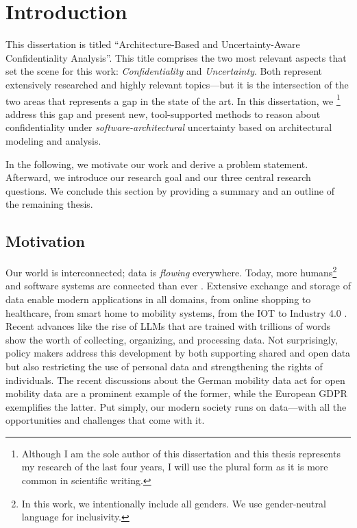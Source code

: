 \chapter{Introduction}%
\label{ch:introduction}%
 

This dissertation is titled \enquote{Architecture-Based and Uncertainty-Aware Confidentiality Analysis}.
This title comprises the two most relevant aspects that set the scene for this work: \emph{Confidentiality} and \emph{Uncertainty}.
Both represent extensively researched and highly relevant topics---but it is the intersection of the two areas that represents a gap in the state of the art.
In this dissertation, we%
\footnote{Although I am the sole author of this dissertation and this thesis represents my research of the last four years, I will use the plural form as it is more common in scientific writing.} address this gap and present new, tool-supported methods to reason about confidentiality under \emph{software-architectural} uncertainty based on architectural modeling and analysis.

In the following, we motivate our work and derive a problem statement.
Afterward, we introduce our research goal and our three central research questions.
We conclude this section by providing a summary and an outline of the remaining thesis.





\section{Motivation}%
\label{sec:introduction:motivation}

Our world is interconnected; data is \emph{flowing} everywhere.
Today, more humans\footnote{In this work, we intentionally include all genders. We use gender-neutral language for inclusivity.} and software systems are connected than ever \cite{statista_number_2004}.
Extensive exchange and storage of data enable modern applications in all domains, from online shopping to healthcare, from smart home to mobility systems, from the \ac{IOT} to Industry 4.0 \cite{heinrich_dynamic_2023}.
Recent advances like the rise of \acp{LLM} that are trained with trillions of words \cite{villalobos_will_2024,meta_introducing_2024} show the worth of collecting, organizing, and processing data.
Not surprisingly, policy makers address this development by both supporting shared and open data but also restricting the use of personal data and strengthening the rights of individuals.
The recent discussions about the German mobility data act for open mobility data \cite{bmdv_bmdv_2022} are a prominent example of the former, while the European \ac{GDPR} \cite{council_of_european_union_regulation_2016} exemplifies the latter.
Put simply, our modern society runs on data---with all the opportunities and challenges that come with it.

